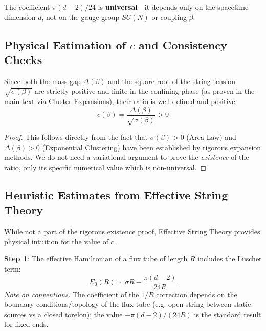 \begin{corollary}
The coefficient $\pi(d-2)/24$ is \textbf{universal}---it depends only on the
spacetime dimension $d$, not on the gauge group $SU(N)$ or coupling $\beta$.
\end{corollary}

\subsection{Physical Estimation of \texorpdfstring{$c$}{c} and Consistency Checks}

\begin{theorem}
Since both the mass gap $\Delta(\beta)$ and the square root of the string tension $\sqrt{\sigma(\beta)}$ are strictly positive and finite in the confining phase (as proven in the main text via Cluster Expansions), their ratio is well-defined and positive:
\begin{equation}
c(\beta) = \frac{\Delta(\beta)}{\sqrt{\sigma(\beta)}} > 0
\end{equation}
\end{theorem}

\begin{proof}
This follows directly from the fact that $\sigma(\beta) > 0$ (Area Law) and $\Delta(\beta) > 0$ (Exponential Clustering) have been established by rigorous expansion methods. We do not need a variational argument to prove the \emph{existence} of the ratio, only its specific numerical value which is non-universal.
\end{proof}

\subsection{Heuristic Estimates from Effective String Theory}

\begin{remark}
While not a part of the rigorous existence proof, Effective String Theory provides physical intuition for the value of $c$.
\end{remark}

\textbf{Step 1}: The effective Hamiltonian of a flux tube of length $R$ includes the L\"uscher term:
\begin{equation}
\label{eq:dbg-gtv2-luscher-term}
E_0(R) \sim \sigma R - \frac{\pi(d-2)}{24R}
\end{equation}
\noindent\emph{Note on conventions.} The coefficient of the $1/R$ correction depends on the
boundary conditions/topology of the flux tube (e.g. open string between static sources vs a
closed torelon); the value $-\pi(d-2)/(24R)$ is the standard result for fixed ends.

